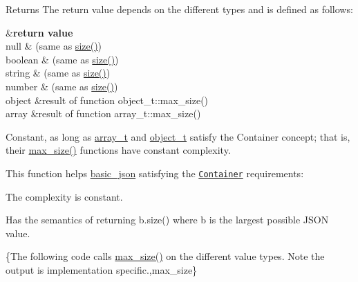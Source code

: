 \begin{DoxyReturn}{Returns}
The return value depends on the different types and is defined as follows\-: \begin{TabularC}{2}
\hline
{}&{\bf return value  }\\
null &{} (same as {\ttfamily \hyperlink{classnlohmann_1_1basic__json_a0ea8a1ecca4b3cb0ba09ad7552c364b6}{size()}}) \\
boolean &{} (same as {\ttfamily \hyperlink{classnlohmann_1_1basic__json_a0ea8a1ecca4b3cb0ba09ad7552c364b6}{size()}}) \\
string &{} (same as {\ttfamily \hyperlink{classnlohmann_1_1basic__json_a0ea8a1ecca4b3cb0ba09ad7552c364b6}{size()}}) \\
number &{} (same as {\ttfamily \hyperlink{classnlohmann_1_1basic__json_a0ea8a1ecca4b3cb0ba09ad7552c364b6}{size()}}) \\
object &result of function {\ttfamily object\-\_\-t\-::max\-\_\-size()} \\
array &result of function {\ttfamily array\-\_\-t\-::max\-\_\-size()} \\
\end{TabularC}
Constant, as long as \hyperlink{classnlohmann_1_1basic__json_ab00b882d39306d663c23dab110f5cae0}{array\-\_\-t} and \hyperlink{classnlohmann_1_1basic__json_a0ac9894c9de8dc551cf2e5f1c605537f}{object\-\_\-t} satisfy the Container concept; that is, their {\ttfamily \hyperlink{classnlohmann_1_1basic__json_a7936417b875b7ec737f77ef84bbf7871}{max\-\_\-size()}} functions have constant complexity.
\end{DoxyReturn}
This function helps {\ttfamily \hyperlink{classnlohmann_1_1basic__json}{basic\-\_\-json}} satisfying the \href{http://en.cppreference.com/w/cpp/concept/Container}{\tt Container} requirements\-:
\begin{DoxyItemize}
\item The complexity is constant.
\item Has the semantics of returning {\ttfamily b.\-size()} where {\ttfamily b} is the largest possible J\-S\-O\-N value.
\end{DoxyItemize}

\{The following code calls {\ttfamily \hyperlink{classnlohmann_1_1basic__json_a7936417b875b7ec737f77ef84bbf7871}{max\-\_\-size()}} on the different value types. Note the output is implementation specific.,max\-\_\-size\}

